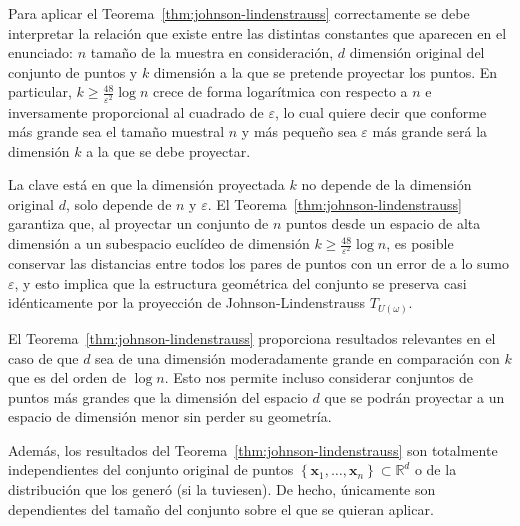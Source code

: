 \begin{remark}
	Para aplicar el Teorema~\ref{thm:johnson-lindenstrauss}
	correctamente se debe interpretar la relación que existe entre las
	distintas constantes que aparecen en el enunciado:
	$n$ tamaño de la muestra en consideración, $d$ dimensión original
	del conjunto de puntos y $k$ dimensión a la que se pretende
	proyectar los puntos.
	En particular, $k\geq\frac{48}{\varepsilon^{2}}\log n$ crece de
	forma logarítmica con respecto a $n$ e inversamente proporcional al
	cuadrado de $\varepsilon$, lo cual quiere decir que conforme más
	grande sea el tamaño muestral $n$ y más pequeño sea $\varepsilon$
	más grande será la dimensión $k$ a la que se debe proyectar.
\end{remark}

\begin{remark}
	La clave está en que la dimensión proyectada $k$ no depende de la
	dimensión original $d$, solo depende de $n$ y $\varepsilon$.
	El Teorema~\ref{thm:johnson-lindenstrauss} garantiza que, al
	proyectar un conjunto de $n$ puntos desde un espacio de alta
	dimensión a un subespacio euclídeo de dimensión
	$k\geq\frac{48}{\varepsilon^{2}}\log n$, es posible conservar las
	distancias entre todos los pares de puntos con un error de a lo
	sumo $\varepsilon$, y esto implica que la estructura geométrica del
	conjunto se preserva casi idénticamente por la proyección de
	Johnson-Lindenstrauss $T_{U\left(\omega\right)}$.
\end{remark}

\begin{remark}
	El Teorema~\ref{thm:johnson-lindenstrauss} proporciona resultados
	relevantes en el caso de que $d$ sea de una dimensión moderadamente
	grande en comparación con $k$ que es del orden de $\log n$.
	Esto nos permite incluso considerar conjuntos de puntos más grandes
	que la dimensión del espacio $d$ que se podrán proyectar a un
	espacio de dimensión menor sin perder su geometría.
\end{remark}

\begin{remark}
	Además, los resultados del Teorema~\ref{thm:johnson-lindenstrauss}
	son totalmente independientes del conjunto original de puntos
	\begin{math}
		\left\{\symbf{x}_{1},\dotsc,\symbf{x}_{n}\right\}\subset
		\mathbb{R}^{d}
	\end{math}
	o de la distribución que los generó (si la tuviesen).
	De hecho, únicamente son dependientes del tamaño del conjunto sobre
	el que se quieran aplicar.
\end{remark}
